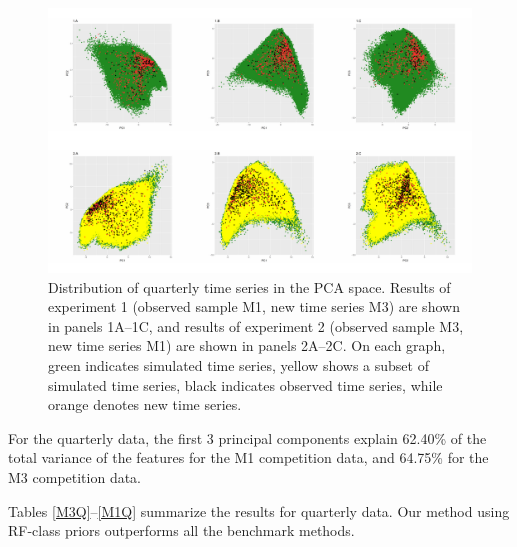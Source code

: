 \documentclass[11pt,a4paper,]{article}
\theoremstyle{definition}
\theoremstyle{definition}
\theoremstyle{definition}
\theoremstyle{remark}
\begin{document}
\begin{figure}[!bp]

{\centering \includegraphics[width=\textwidth]{figure/pca2-1} 

}

\caption{Distribution of quarterly time series in the PCA space. Results of experiment 1 (observed sample M1, new time series M3) are shown in panels 1A--1C, and results of experiment 2 (observed sample M3, new time series M1) are shown in panels 2A--2C. On each graph, green indicates simulated time series, yellow shows a subset of simulated time series, black indicates observed time series, while orange denotes new time series.}\label{fig:pca2}
\end{figure}

For the quarterly data, the first 3 principal components explain 62.40\%
of the total variance of the features for the M1 competition data, and
64.75\% for the M3 competition data.

Tables \ref{M3Q}--\ref{M1Q} summarize the results for quarterly data.
Our method using RF-class priors outperforms all the benchmark methods.
\end{document}
